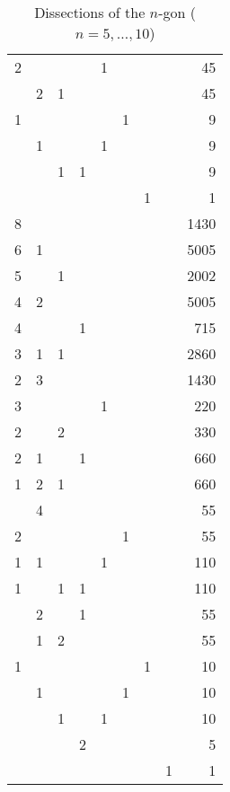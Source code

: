 \documentclass[10pt]{amsart}
\begin{document}
\begin{table}[h]
{\begin{tabular}{|rrrrrrrrr|}
            2 &&&& 1 &&&& 45 \\
            & 2 & 1 &&&&&& 45 \\
            1 &&&&& 1 &&& 9 \\
            & 1 &&& 1 &&&& 9 \\
            && 1 & 1 &&&&& 9 \\
            &&&&&& 1 && 1 \\ \hline
            8 &&&&&&&& 1430 \\ 
            6 & 1 &&&&&&& 5005 \\
            5 && 1 &&&&&& 2002 \\
            4 & 2 &&&&&&& 5005 \\
            4 &&& 1 &&&&& 715 \\
            3 & 1 & 1 &&&&&& 2860 \\
            2 & 3 &&&&&&& 1430 \\
            3 &&&& 1 &&&& 220 \\
            2 && 2 &&&&&& 330 \\
            2 & 1 && 1 &&&&& 660 \\
            1 & 2 & 1 &&&&&& 660 \\
            & 4 &&&&&&& 55 \\ 
            2 &&&&& 1 &&& 55 \\
            1 & 1 &&& 1 &&&& 110 \\
            1 && 1 & 1 &&&&& 110 \\
            & 2 && 1 &&&&& 55 \\
            & 1 & 2 &&&&&& 55 \\
            1 &&&&&& 1 && 10 \\
            & 1 &&&& 1 &&& 10 \\
            && 1 && 1 &&&& 10 \\
            &&& 2 &&&&& 5 \\ 
            &&&&&&& 1 & 1 \\ \hline
            \end{tabular}}
            \vspace{.2cm}
\caption{Dissections of the $n$-gon ($n=5,\ldots,10$)}
\label{t:diss}
\end{table}
\end{document}
